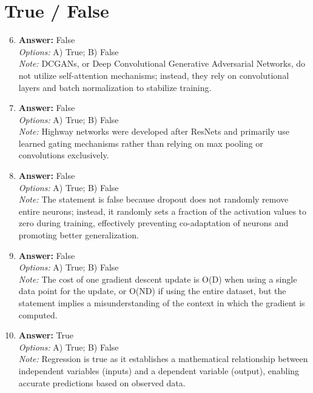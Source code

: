 \documentclass[12pt]{article}
\begin{document}
\section*{True / False}
\begin{enumerate}[label=\arabic*.]
\setcounter{enumi}{5}
\item \textbf{Answer:} False
\\ \textit{Options:} A) True; B) False
\\ \textit{Note:} DCGANs, or Deep Convolutional Generative Adversarial Networks, do not utilize self-attention mechanisms; instead, they rely on convolutional layers and batch normalization to stabilize training.
\item \textbf{Answer:} False
\\ \textit{Options:} A) True; B) False
\\ \textit{Note:} Highway networks were developed after ResNets and primarily use learned gating mechanisms rather than relying on max pooling or convolutions exclusively.
\item \textbf{Answer:} False
\\ \textit{Options:} A) True; B) False
\\ \textit{Note:} The statement is false because dropout does not randomly remove entire neurons; instead, it randomly sets a fraction of the activation values to zero during training, effectively preventing co-adaptation of neurons and promoting better generalization.
\item \textbf{Answer:} False
\\ \textit{Options:} A) True; B) False
\\ \textit{Note:} The cost of one gradient descent update is O(D) when using a single data point for the update, or O(ND) if using the entire dataset, but the statement implies a misunderstanding of the context in which the gradient is computed.
\item \textbf{Answer:} True
\\ \textit{Options:} A) True; B) False
\\ \textit{Note:} Regression is true as it establishes a mathematical relationship between independent variables (inputs) and a dependent variable (output), enabling accurate predictions based on observed data.
\end{enumerate}
\end{document}
